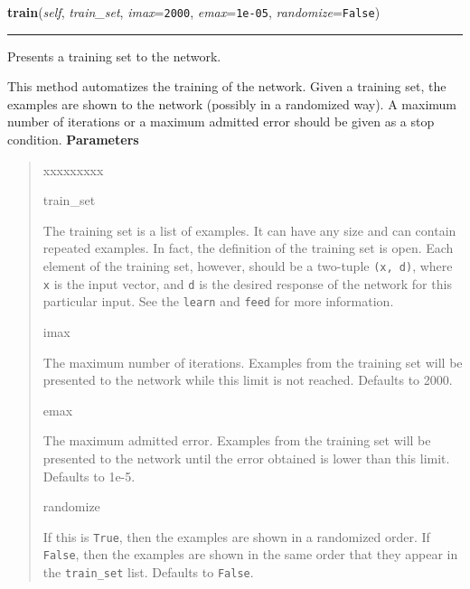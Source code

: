 \hspace{.8\funcindent}\begin{boxedminipage}{\funcwidth}

    \raggedright \textbf{train}(\textit{self}, \textit{train\_set}, \textit{imax}={\tt 2000}, \textit{emax}={\tt 1e-05}, \textit{randomize}={\tt False})

    \vspace{-1.5ex}

    \rule{\textwidth}{0.5\fboxrule}
\setlength{\parskip}{2ex}

Presents a training set to the network.

This method automatizes the training of the network. Given a training
set, the examples are shown to the network (possibly in a randomized
way). A maximum number of iterations or a maximum admitted error should
be given as a stop condition.
\setlength{\parskip}{1ex}
      \textbf{Parameters}
      \vspace{-1ex}

      \begin{quote}
        \begin{Ventry}{xxxxxxxxx}

          \item[train\_set]


The training set is a list of examples. It can have any size and can
contain repeated examples. In fact, the definition of the training
set is open. Each element of the training set, however, should be a
two-tuple \texttt{(x, d)}, where \texttt{x} is the input vector, and \texttt{d} is
the desired response of the network for this particular input. See
the \texttt{learn} and \texttt{feed} for more information.
          \item[imax]


The maximum number of iterations. Examples from the training set
will be presented to the network while this limit is not reached.
Defaults to 2000.
          \item[emax]


The maximum admitted error. Examples from the training set will be
presented to the network until the error obtained is lower than this
limit. Defaults to 1e-5.
          \item[randomize]


If this is \texttt{True}, then the examples are shown in a randomized
order. If \texttt{False}, then the examples are shown in the same order
that they appear in the \texttt{train\_set} list. Defaults to \texttt{False}.
        \end{Ventry}

      \end{quote}

    \end{boxedminipage}


